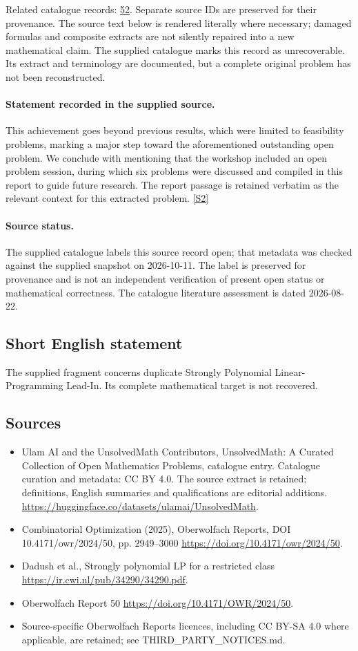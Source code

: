 \documentclass[11pt]{article}
\begin{document}
Related catalogue records: \href{https://mehmetmars7.github.io/Erdosproblems-llm-hunter/problem.html?type=open_problems&id=52}{52}. Separate source IDs are preserved for their provenance.
The source text below is rendered literally where necessary; damaged formulas and composite extracts are not silently repaired into a new mathematical claim.
The supplied catalogue marks this record as unrecoverable. Its extract and terminology are documented, but a complete original problem has not been reconstructed.
\paragraph{Statement recorded in the supplied source.}
This achievement goes beyond previous results, which were limited to feasibility problems, marking a major step toward the aforementioned outstanding open problem. We conclude with mentioning that the workshop included an open problem session, during which six problems were discussed and compiled in this report to guide future research. The report passage is retained verbatim as the relevant context for this extracted problem. \href{https://doi.org/10.4171/owr/2024/50}{[S2]}
\paragraph{Source status.}
The supplied catalogue labels this source record open; that metadata was checked against the supplied snapshot on 2026-10-11. The label is preserved for provenance and is not an independent verification of present open status or mathematical correctness. The catalogue literature assessment is dated 2026-08-22.
\subsection{Short English statement}
The supplied fragment concerns duplicate Strongly Polynomial Linear-Programming Lead-In. Its complete mathematical target is not recovered.
\subsection{Sources}
\begin{itemize}
\item[S1] Ulam AI and the UnsolvedMath Contributors, UnsolvedMath: A Curated Collection of Open Mathematics Problems, catalogue entry. Catalogue curation and metadata: CC BY 4.0. The source extract is retained; definitions, English summaries and qualifications are editorial additions.
\url{https://huggingface.co/datasets/ulamai/UnsolvedMath}.
\item[S2] Combinatorial Optimization (2025), Oberwolfach Reports, DOI 10.4171/owr/2024/50, pp. 2949--3000
\url{https://doi.org/10.4171/owr/2024/50}.
\item[S3] Dadush et al., Strongly polynomial LP for a restricted class
\url{https://ir.cwi.nl/pub/34290/34290.pdf}.
\item[S4] Oberwolfach Report 50
\url{https://doi.org/10.4171/OWR/2024/50}.
\item Source-specific Oberwolfach Reports licences, including CC BY-SA 4.0 where applicable, are retained; see THIRD\_PARTY\_NOTICES.md.
\end{itemize}
\end{document}
